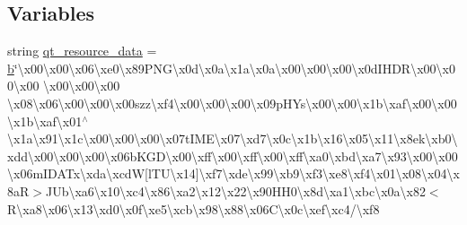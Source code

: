 \subsection*{Variables}
\begin{DoxyCompactItemize}
\item 
string \mbox{\hyperlink{namespacegetdist_1_1gui_1_1Resources__pyside_af50cbd25e144ba8f3b789c2151ac1918}{qt\+\_\+resource\+\_\+data}} = \mbox{\hyperlink{plotTT_8m_ac0431efac4d7c393d1e70b86115cb93f}{b}}\char`\"{}\textbackslash{}x00\textbackslash{}x00\textbackslash{}x06\textbackslash{}xe0\textbackslash{}x89\+P\+N\+G\textbackslash{}x0d\textbackslash{}x0a\textbackslash{}x1a\textbackslash{}x0a\textbackslash{}x00\textbackslash{}x00\textbackslash{}x00\textbackslash{}x0d\+I\+H\+D\+R\textbackslash{}x00\textbackslash{}x00\textbackslash{}x00 \textbackslash{}x00\textbackslash{}x00\textbackslash{}x00 \textbackslash{}x08\textbackslash{}x06\textbackslash{}x00\textbackslash{}x00\textbackslash{}x00szz\textbackslash{}xf4\textbackslash{}x00\textbackslash{}x00\textbackslash{}x00\textbackslash{}x09p\+H\+Ys\textbackslash{}x00\textbackslash{}x00\textbackslash{}x1b\textbackslash{}xaf\textbackslash{}x00\textbackslash{}x00\textbackslash{}x1b\textbackslash{}xaf\textbackslash{}x01$^\wedge$\textbackslash{}x1a\textbackslash{}x91\textbackslash{}x1c\textbackslash{}x00\textbackslash{}x00\textbackslash{}x00\textbackslash{}x07t\+I\+M\+E\textbackslash{}x07\textbackslash{}xd7\textbackslash{}x0c\textbackslash{}x1b\textbackslash{}x16\textbackslash{}x05\textbackslash{}x11\textbackslash{}x8ek\textbackslash{}xb0\textbackslash{}xdd\textbackslash{}x00\textbackslash{}x00\textbackslash{}x00\textbackslash{}x06b\+K\+G\+D\textbackslash{}x00\textbackslash{}xff\textbackslash{}x00\textbackslash{}xff\textbackslash{}x00\textbackslash{}xff\textbackslash{}xa0\textbackslash{}xbd\textbackslash{}xa7\textbackslash{}x93\textbackslash{}x00\textbackslash{}x00\textbackslash{}x06m\+I\+D\+A\+Tx\textbackslash{}xda\textbackslash{}xcdW\mbox{[}l\+T\+U\textbackslash{}x14\mbox{]}\textbackslash{}xf7\textbackslash{}xde\textbackslash{}x99\textbackslash{}xb9\textbackslash{}xf3\textbackslash{}xe8\textbackslash{}xf4\textbackslash{}x01\textbackslash{}x08\textbackslash{}x04\textbackslash{}x8aR$>$J\+Ub\textbackslash{}xa6\textbackslash{}x10\textbackslash{}xc4\textbackslash{}x86\textbackslash{}xa2\textbackslash{}x12\textbackslash{}x22\textbackslash{}x90\+H\+H0\textbackslash{}x8d\textbackslash{}xa1\textbackslash{}xbc\textbackslash{}x0a\textbackslash{}x82$<$R\textbackslash{}xa8\textbackslash{}x06\textbackslash{}x13\textbackslash{}xd0\textbackslash{}x0f\textbackslash{}xe5\textbackslash{}xcb\textbackslash{}x98\textbackslash{}x88\textbackslash{}x06\+C\textbackslash{}x0c\textbackslash{}xef\textbackslash{}xc4/\textbackslash{}xf8 
\end{DoxyCompactItemize}
